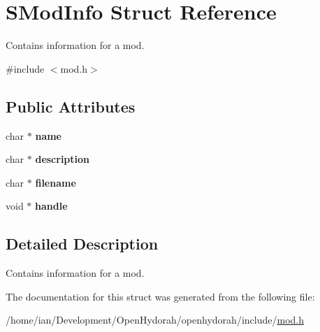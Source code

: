 \hypertarget{structSModInfo}{\section{S\-Mod\-Info Struct Reference}
\label{structSModInfo}
}


Contains information for a mod.  




{\ttfamily \#include $<$mod.\-h$>$}

\subsection*{Public Attributes}
\begin{DoxyCompactItemize}
\item 
\hypertarget{structSModInfo_a368b50c1dbe6e68c2d728d26f0c87483}{char $\ast$ {\bfseries name}}\label{structSModInfo_a368b50c1dbe6e68c2d728d26f0c87483}

\item 
\hypertarget{structSModInfo_a1988c2a7cfd5758cb09c1e0a2ccbf898}{char $\ast$ {\bfseries description}}\label{structSModInfo_a1988c2a7cfd5758cb09c1e0a2ccbf898}

\item 
\hypertarget{structSModInfo_a041ad71d06dd4f19bce7200b6eeaf7d6}{char $\ast$ {\bfseries filename}}\label{structSModInfo_a041ad71d06dd4f19bce7200b6eeaf7d6}

\item 
\hypertarget{structSModInfo_a3ae99c348fd2555bc92675c0a2f06089}{void $\ast$ {\bfseries handle}}\label{structSModInfo_a3ae99c348fd2555bc92675c0a2f06089}

\end{DoxyCompactItemize}


\subsection{Detailed Description}
Contains information for a mod. 

The documentation for this struct was generated from the following file\-:\begin{DoxyCompactItemize}
\item 
/home/ian/\-Development/\-Open\-Hydorah/openhydorah/include/\hyperlink{mod_8h}{mod.\-h}\end{DoxyCompactItemize}
